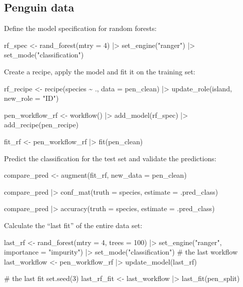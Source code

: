 \documentclass[
  letterpaper,
  DIV=11,
  numbers=noendperiod]{scrreprt}
\newenvironment{Shaded}{\begin{snugshade}}{\end{snugshade}}
\newcommand{\NormalTok}[1]{\textcolor[rgb]{0.00,0.23,0.31}{#1}}
\begin{document}
\subsection{Penguin data}\label{penguin-data-1}

Define the model specification for random forests:

\begin{Shaded}
\begin{Highlighting}[]
\NormalTok{rf\_spec \textless{}{-} rand\_forest(mtry = 4) |\textgreater{}}
\NormalTok{  set\_engine("ranger") |\textgreater{}}
\NormalTok{  set\_mode("classification")}
\end{Highlighting}
\end{Shaded}

Create a recipe, apply the model and fit it on the training set:

\begin{Shaded}
\begin{Highlighting}[]
\NormalTok{rf\_recipe \textless{}{-} }
\NormalTok{  recipe(species \textasciitilde{} ., data = pen\_clean) |\textgreater{} }
\NormalTok{  update\_role(island,  new\_role = "ID")}

\NormalTok{pen\_workflow\_rf \textless{}{-} workflow() |\textgreater{}}
\NormalTok{  add\_model(rf\_spec) |\textgreater{}}
\NormalTok{  add\_recipe(pen\_recipe)}

\NormalTok{fit\_rf \textless{}{-} pen\_workflow\_rf |\textgreater{} fit(pen\_clean)}
\end{Highlighting}
\end{Shaded}

Predict the classification for the test set and validate the
predictions:

\begin{Shaded}
\begin{Highlighting}[]
\NormalTok{compare\_pred \textless{}{-} augment(fit\_rf, new\_data = pen\_clean) }

\NormalTok{compare\_pred |\textgreater{} conf\_mat(truth = species, estimate = .pred\_class)}

\NormalTok{compare\_pred |\textgreater{}  accuracy(truth = species, estimate = .pred\_class)}
\end{Highlighting}
\end{Shaded}

Calculate the ``last fit'' of the entire data set:

\begin{Shaded}
\begin{Highlighting}[]
\NormalTok{last\_rf \textless{}{-} }
\NormalTok{  rand\_forest(mtry = 4, trees = 100) |\textgreater{} }
\NormalTok{  set\_engine("ranger",  importance = "impurity") |\textgreater{} }
\NormalTok{  set\_mode("classification")}
\NormalTok{\# the last workflow}
\NormalTok{last\_workflow \textless{}{-} }
\NormalTok{  pen\_workflow\_rf |\textgreater{} }
\NormalTok{  update\_model(last\_rf)}

\NormalTok{\# the last fit}
\NormalTok{set.seed(3)}
\NormalTok{last\_rf\_fit \textless{}{-} }
\NormalTok{  last\_workflow |\textgreater{} }
\NormalTok{  last\_fit(pen\_split)}
\end{Highlighting}
\end{Shaded}
\end{document}
